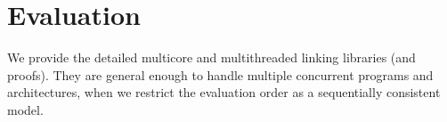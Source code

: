 \section{Evaluation}
\label{chapter:linking:sec:evaluation}

We provide the detailed multicore and multithreaded linking libraries (and proofs).
They are general enough to handle multiple concurrent programs and architectures,
when we restrict the evaluation order as a sequentially consistent model. 

